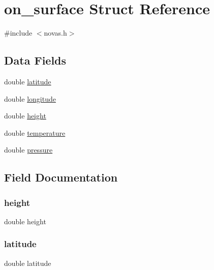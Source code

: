 \hypertarget{structon__surface}{}\section{on\+\_\+surface Struct Reference}
\label{structon__surface}


{\ttfamily \#include $<$novas.\+h$>$}

\subsection*{Data Fields}
\begin{DoxyCompactItemize}
\item 
double \mbox{\hyperlink{structon__surface_a76714bdbc5c536fa77dfb14533ff82a9}{latitude}}
\item 
double \mbox{\hyperlink{structon__surface_ac155e35fdeebafc89723a51520fb9fe6}{longitude}}
\item 
double \mbox{\hyperlink{structon__surface_a89f6abd564014faeff7cd20c340a9c7d}{height}}
\item 
double \mbox{\hyperlink{structon__surface_ab4b11c8d9c758430960896bc3fe82ead}{temperature}}
\item 
double \mbox{\hyperlink{structon__surface_aee1c5d07ac79c5c036195858afe33405}{pressure}}
\end{DoxyCompactItemize}


\subsection{Field Documentation}
\mbox{\label{structon__surface_a89f6abd564014faeff7cd20c340a9c7d}} 
\subsubsection{\texorpdfstring{height}{height}}
{\footnotesize\ttfamily double height}

\mbox{\label{structon__surface_a76714bdbc5c536fa77dfb14533ff82a9}} 
\subsubsection{\texorpdfstring{latitude}{latitude}}
{\footnotesize\ttfamily double latitude}


